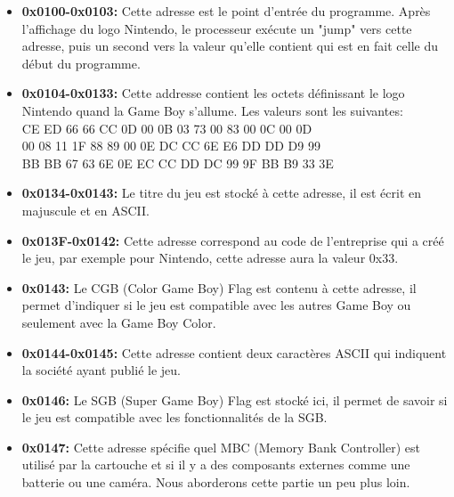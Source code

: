 \documentclass[french]{report}
\begin{document}
\begin{itemize}

\item \textbf{0x0100-0x0103:} Cette adresse est le point d'entrée du programme. Après l'affichage du logo Nintendo, le processeur exécute un "jump" vers cette adresse, puis un second vers la valeur qu'elle contient qui est en fait celle du début du programme.\\

\item \textbf{0x0104-0x0133:} Cette addresse contient les octets définissant le logo Nintendo quand la Game Boy s'allume. Les valeurs sont les suivantes:
\\CE ED 66 66 CC 0D 00 0B 03 73 00 83 00 0C 00 0D
\\00 08 11 1F 88 89 00 0E DC CC 6E E6 DD DD D9 99
\\BB BB 67 63 6E 0E EC CC DD DC 99 9F BB B9 33 3E\\

\item \textbf{0x0134-0x0143:} Le titre du jeu est stocké à cette adresse, il est écrit en majuscule et en ASCII.\\

\item \textbf{0x013F-0x0142:} Cette adresse correspond au code de l'entreprise qui a créé le jeu, par exemple pour Nintendo, cette adresse aura la valeur 0x33.\\

\item \textbf{0x0143:} Le CGB (Color Game Boy) Flag est contenu à cette adresse, il permet d'indiquer si le jeu est compatible avec les autres Game Boy ou seulement avec la Game Boy Color.\\

\item \textbf{0x0144-0x0145:} Cette adresse contient deux caractères ASCII qui indiquent la société ayant publié le jeu.\\

\item \textbf{0x0146:} Le SGB (Super Game Boy) Flag est stocké ici, il permet de savoir si le jeu est compatible avec les fonctionnalités de la SGB.\\

\item \textbf{0x0147:} Cette adresse spécifie quel MBC (Memory Bank Controller) est utilisé par la cartouche et si il y a des composants externes comme une batterie ou une caméra. Nous aborderons cette partie un peu plus loin.\\


\end{itemize}
\end{document}
